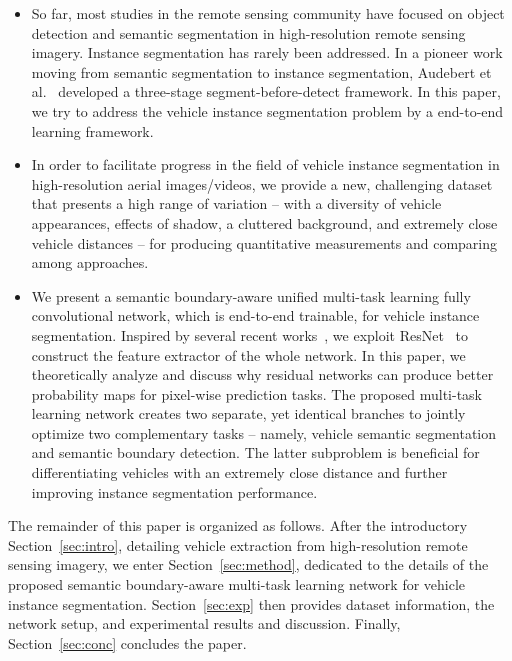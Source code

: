 \documentclass[journal]{IEEEtran}
\begin{document}
\begin{itemize}
  \item So far, most studies in the remote sensing community have focused on object detection and semantic segmentation in high-resolution remote sensing imagery. Instance segmentation has rarely been addressed. In a pioneer work moving from semantic segmentation to instance segmentation, Audebert et al.~\cite{AudebertRS17} developed a three-stage segment-before-detect framework. In this paper, we try to address the vehicle instance segmentation problem by a end-to-end learning framework.
  \item In order to facilitate progress in the field of vehicle instance segmentation in high-resolution aerial images/videos, we provide a new, challenging dataset that presents a high range of variation -- with a diversity of vehicle appearances, effects of shadow, a cluttered background, and extremely close vehicle distances -- for producing quantitative measurements and comparing among approaches.
  \item We present a semantic boundary-aware unified multi-task learning fully convolutional network, which is end-to-end trainable, for vehicle instance segmentation. Inspired by several recent works~\cite{Zhaocvpr17,Wu16,Laina16}, we exploit ResNet~\cite{ResNet} to construct the feature extractor of the whole network. In this paper, we theoretically analyze and discuss why residual networks can produce better probability maps for pixel-wise prediction tasks. The proposed multi-task learning network creates  two separate, yet identical branches to jointly optimize two complementary tasks -- namely, vehicle semantic segmentation and semantic boundary detection. The latter subproblem is beneficial for differentiating vehicles with an extremely close distance and further improving instance segmentation performance.
\end{itemize}
\par
The remainder of this paper is organized as follows. After the introductory Section~\ref{sec:intro}, detailing vehicle extraction from high-resolution remote sensing imagery, we enter Section~\ref{sec:method}, dedicated to the details of the proposed semantic boundary-aware multi-task learning network for vehicle instance segmentation. Section~\ref{sec:exp} then provides dataset information, the network setup, and experimental results and discussion. Finally, Section~\ref{sec:conc} concludes the paper.
\end{document}
